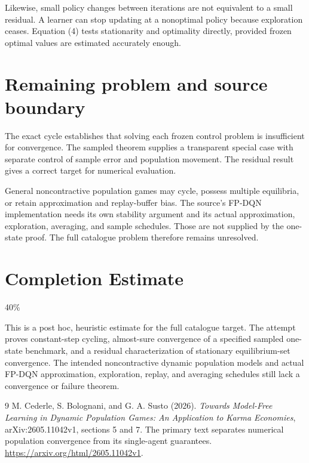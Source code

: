 \documentclass[11pt,a4paper]{article}
\begin{document}
Likewise, small policy changes between iterations are not equivalent to a small residual. A learner can stop updating at a nonoptimal policy because exploration ceases. Equation (4) tests stationarity and optimality directly, provided frozen optimal values are estimated accurately enough.
\section{Remaining problem and source boundary}
The exact cycle establishes that solving each frozen control problem is insufficient for convergence. The sampled theorem supplies a transparent special case with separate control of sample error and population movement. The residual result gives a correct target for numerical evaluation.

General noncontractive population games may cycle, possess multiple equilibria, or retain approximation and replay-buffer bias. The source's FP-DQN implementation needs its own stability argument and its actual approximation, exploration, averaging, and sample schedules. Those are not supplied by the one-state proof. The full catalogue problem therefore remains unresolved.

\section{Completion Estimate}
40\%

This is a post hoc, heuristic estimate for the full catalogue target.
The attempt proves constant-step cycling, almost-sure convergence of a specified sampled one-state benchmark, and a residual characterization of stationary equilibrium-set convergence. The intended noncontractive dynamic population models and actual FP-DQN approximation, exploration, replay, and averaging schedules still lack a convergence or failure theorem.

\begin{thebibliography}{9}
 M. Cederle, S. Bolognani, and G. A. Susto (2026).
\emph{Towards Model-Free Learning in Dynamic Population Games: An Application to Karma Economies}, arXiv:2605.11042v1, sections 5 and 7.
The primary text separates numerical population convergence from its single-agent guarantees.
\url{https://arxiv.org/html/2605.11042v1}.
\end{thebibliography}
\end{document}
